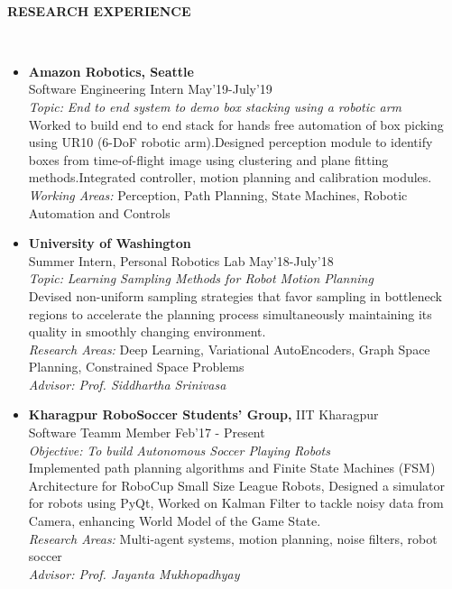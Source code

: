 \documentclass[a4paper,8pt]{article}
\newcommand{\lsep}{-0.5cm}
\newcommand{\resheading}[1]{{\small \colorbox{mygrey}{\begin{minipage}{0.975\textwidth}{\textbf{#1 \vphantom{p\^{E}}}}\end{minipage}}}}
\begin{document}
\hspace{0.5cm}\\[-0.2cm]
\resheading{\textbf{RESEARCH EXPERIENCE} }\\[\lsep]

\begin{itemize}
\item \textbf{Amazon Robotics, Seattle} \\
\small{Software Engineering Intern} \hfill \small{May'19-July'19}  \\
\textit{Topic: } \textit{End to end system to demo box stacking using a robotic arm} \\
\small{Worked to build end to end stack for hands free automation of box picking using UR10 (6-DoF robotic arm).Designed perception module to identify boxes from time-of-flight image using clustering and plane fitting methods.Integrated controller, motion planning and calibration modules.} \\
\textit{Working Areas: } \small{Perception, Path Planning, State Machines, Robotic Automation and Controls} 

\item \textbf{University of Washington} \\
\small{Summer Intern, Personal Robotics Lab} \hfill \small{May'18-July'18}  \\
\textit{Topic: } \textit{Learning Sampling Methods for Robot Motion Planning} \\
\small{Devised non-uniform sampling strategies that favor sampling in bottleneck regions to accelerate
the planning process simultaneously maintaining its quality in smoothly changing environment.} \\
\textit{Research Areas: } \small{Deep Learning, Variational AutoEncoders, Graph Space Planning, Constrained Space Problems} \\
\textit{Advisor: Prof. Siddhartha Srinivasa}

\item \textbf{Kharagpur RoboSoccer Students' Group,} \small{ IIT Kharagpur} \\
\small{Software Teamm Member} \hfill \small{Feb'17 - Present}\\
\textit{Objective: } \textit{To build Autonomous Soccer Playing Robots} \\
\small{Implemented path planning algorithms and Finite State Machines (FSM) Architecture for RoboCup Small Size League Robots, Designed a simulator for
robots using PyQt, Worked on Kalman Filter to tackle noisy data from Camera, enhancing World Model of the Game State.} \\
\textit{Research Areas: } \small{Multi-agent systems, motion planning, noise filters, robot soccer} \\
\textit{Advisor: Prof. Jayanta Mukhopadhyay} 
\end{itemize}
\end{document}
